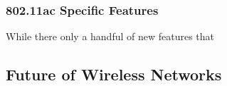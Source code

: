 \subsubsection{802.11ac Specific Features}

While there only a handful of new features that

\subsection{Future of Wireless Networks}



